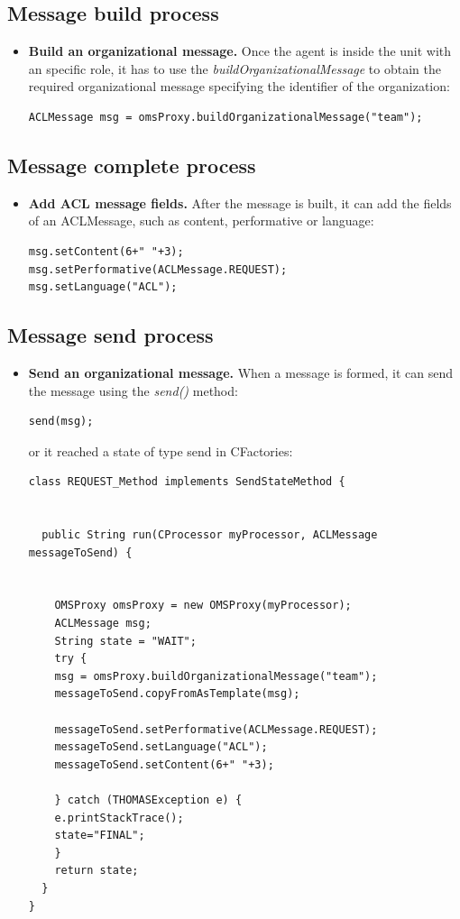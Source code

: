 \subsection{Message build process}
\begin{itemize}
\item \textbf{Build an organizational message.} Once the agent is inside the unit with an specific role, it has to use the \textit{buildOrganizationalMessage} to
obtain the required organizational message specifying the identifier of the organization:
\begin{lstlisting}
ACLMessage msg = omsProxy.buildOrganizationalMessage("team");
\end{lstlisting}
\end{itemize}

\subsection{Message complete process}
\begin{itemize}
\item \textbf{Add ACL message fields.} After the message is built, it can add the fields of an ACLMessage, such as content, performative or language:
\begin{lstlisting}
msg.setContent(6+" "+3);
msg.setPerformative(ACLMessage.REQUEST);
msg.setLanguage("ACL");
\end{lstlisting}
\end{itemize}
\subsection{Message send process}
\begin{itemize}
\item \textbf{Send an organizational message.} When a message is formed, it can send the message using the \textit{send()} method:

\begin{lstlisting}
send(msg);
\end{lstlisting}
or it reached a state of type send in CFactories:
\begin{lstlisting}
class REQUEST_Method implements SendStateMethod {


  public String run(CProcessor myProcessor, ACLMessage messageToSend) {


    OMSProxy omsProxy = new OMSProxy(myProcessor);
    ACLMessage msg;
    String state = "WAIT";
    try {
	msg = omsProxy.buildOrganizationalMessage("team");
	messageToSend.copyFromAsTemplate(msg);

	messageToSend.setPerformative(ACLMessage.REQUEST);
	messageToSend.setLanguage("ACL");
	messageToSend.setContent(6+" "+3);

    } catch (THOMASException e) {
	e.printStackTrace();
	state="FINAL";
    }
    return state;
  }
}
\end{lstlisting}
\end{itemize}


